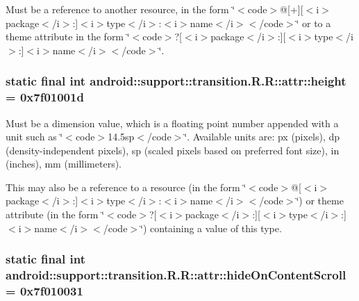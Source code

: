 Must be a reference to another resource, in the form \char`\"{}$<$code$>$@\mbox{[}+\mbox{]}\mbox{[}$<$i$>$package$<$/i$>$:\mbox{]}$<$i$>$type$<$/i$>$:$<$i$>$name$<$/i$>$$<$/code$>$\char`\"{} or to a theme attribute in the form \char`\"{}$<$code$>$?\mbox{[}$<$i$>$package$<$/i$>$:\mbox{]}\mbox{[}$<$i$>$type$<$/i$>$:\mbox{]}$<$i$>$name$<$/i$>$$<$/code$>$\char`\"{}. \hypertarget{classandroid_1_1support_1_1transition_1_1_r_1_1attr_b4fc8513fdf7b40ee541be5062ede392}{
\subsubsection[{height}]{\setlength{\rightskip}{0pt plus 5cm}static final int android::support::transition.R.R::attr::height = 0x7f01001d}}
\label{classandroid_1_1support_1_1transition_1_1_r_1_1attr_b4fc8513fdf7b40ee541be5062ede392}


Must be a dimension value, which is a floating point number appended with a unit such as \char`\"{}$<$code$>$14.5sp$<$/code$>$\char`\"{}. Available units are: px (pixels), dp (density-independent pixels), sp (scaled pixels based on preferred font size), in (inches), mm (millimeters). 

This may also be a reference to a resource (in the form \char`\"{}$<$code$>$@\mbox{[}$<$i$>$package$<$/i$>$:\mbox{]}$<$i$>$type$<$/i$>$:$<$i$>$name$<$/i$>$$<$/code$>$\char`\"{}) or theme attribute (in the form \char`\"{}$<$code$>$?\mbox{[}$<$i$>$package$<$/i$>$:\mbox{]}\mbox{[}$<$i$>$type$<$/i$>$:\mbox{]}$<$i$>$name$<$/i$>$$<$/code$>$\char`\"{}) containing a value of this type. \hypertarget{classandroid_1_1support_1_1transition_1_1_r_1_1attr_df5b7190c8aef4a9b33e193fd61f7ef0}{
\subsubsection[{hideOnContentScroll}]{\setlength{\rightskip}{0pt plus 5cm}static final int android::support::transition.R.R::attr::hideOnContentScroll = 0x7f010031}}
\label{classandroid_1_1support_1_1transition_1_1_r_1_1attr_df5b7190c8aef4a9b33e193fd61f7ef0}


